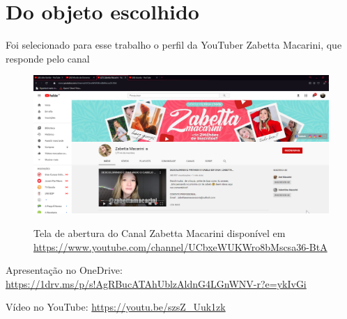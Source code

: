 \section{Do objeto escolhido}

Foi selecionado para esse trabalho o perfil da YouTuber Zabetta Macarini, que responde pelo canal


\begin{figure}
    \centering
    \href{https://www.youtube.com/channel/UCbxeWUKWro8bMscsa36-BtA}{
        \includegraphics[width=0.999\linewidth]{fig/Canal-Zabetta-Macarini}
    }
    \caption{Tela de abertura do Canal Zabetta Macarini disponível em \url{https://www.youtube.com/channel/UCbxeWUKWro8bMscsa36-BtA}}
    \label{fig:canal-zabetta-macarini}
\end{figure}




Apresentação no OneDrive: \url{https://1drv.ms/p/s!AgRBucATAhUblzAldnG4LGnWNV-r?e=ykIvGi} \\
\begin{center}
    \href{https://1drv.ms/p/s!AgRBucATAhUblzAldnG4LGnWNV-r?e=ykIvGi}{
    }
\end{center}


Vídeo no YouTube: \url{https://youtu.be/szsZ_Uuk1zk} \\
\begin{center}
    \href{https://youtu.be/szsZ_Uuk1zk}{
    }
\end{center}
